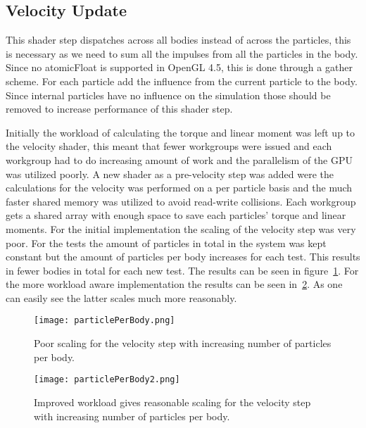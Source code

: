 \subsection{Velocity Update}
This shader step dispatches across all bodies instead of across the particles, this
is necessary as we need to sum all the impulses from all the particles in the body.
Since no atomicFloat is supported in OpenGL 4.5, this is done through a gather scheme.
For each particle add the influence from the current particle to the body.
Since internal particles have no influence on the simulation
those should be removed to increase performance of this shader step.

Initially the workload of calculating the torque and linear moment was left up to the velocity shader,
this meant that fewer workgroups were issued and each workgroup had to do increasing
amount of work and the parallelism of the GPU was utilized poorly. A new shader as
a pre-velocity step was added were the calculations for the velocity was performed
on a per particle basis and the much faster shared memory was utilized to avoid
read-write collisions. Each workgroup gets a shared array with enough space to save
each particles' torque and linear moments. For the initial implementation the scaling of
the velocity step was very poor. For the tests the amount of particles in total in the
system was kept constant but the amount of particles per body increases for each test.
This results in fewer bodies in total for each new test. The results can be seen in figure~\ref{fig:velScale1}.
For the more workload aware implementation the results can be seen in~\ref{fig:velScale2}.
As one can easily see the latter scales much more reasonably.

\begin{figure}[H]
  \centering
  \texttt{[image: particlePerBody.png]}
  \caption{Poor scaling for the velocity step with increasing number of particles per body.}
  \label{fig:velScale1}
\end{figure}

\begin{figure}[H]
  \centering
  \texttt{[image: particlePerBody2.png]}
  \caption{Improved workload gives reasonable scaling for the velocity step with increasing number of particles per body.}
  \label{fig:velScale2}
\end{figure}


